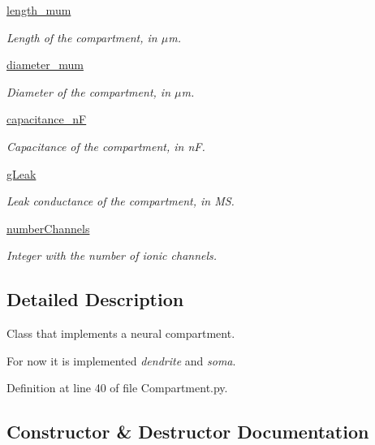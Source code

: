 \begin{DoxyCompactItemize}
\hyperlink{class_compartment_1_1_compartment_a8154742b0082eea301690e3566e477b6}{length\+\_\+mum}
\begin{DoxyCompactList}\small\item\em Length of the compartment, in $\mu$m. \end{DoxyCompactList}\item 
\hyperlink{class_compartment_1_1_compartment_aacb7db7022f5d3534d17642d47281cbb}{diameter\+\_\+mum}
\begin{DoxyCompactList}\small\item\em Diameter of the compartment, in $\mu$m. \end{DoxyCompactList}\item 
\hyperlink{class_compartment_1_1_compartment_ac7d7462a45d4d623ed688c187c9184aa}{capacitance\+\_\+nF}
\begin{DoxyCompactList}\small\item\em Capacitance of the compartment, in nF. \end{DoxyCompactList}\item 
\hyperlink{class_compartment_1_1_compartment_a10d50da6a622982a6483c7cd78482bde}{g\+Leak}
\begin{DoxyCompactList}\small\item\em Leak conductance of the compartment, in MS. \end{DoxyCompactList}\item 
\hyperlink{class_compartment_1_1_compartment_a0fa96147f76e7814f30610027ed425df}{number\+Channels}
\begin{DoxyCompactList}\small\item\em Integer with the number of ionic channels. \end{DoxyCompactList}\end{DoxyCompactItemize}


\subsection{Detailed Description}
Class that implements a neural compartment. 

For now it is implemented {\itshape dendrite} and {\itshape soma}. 

Definition at line 40 of file Compartment.\+py.



\subsection{Constructor \& Destructor Documentation}
